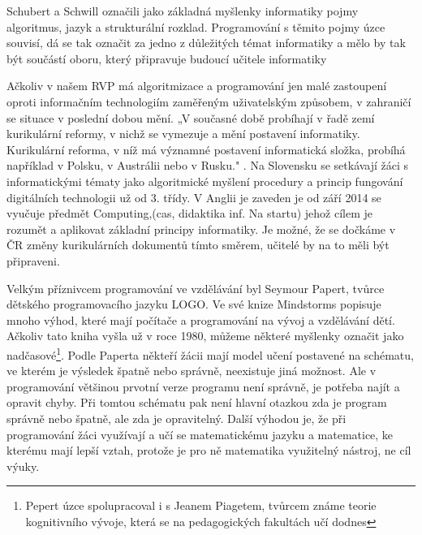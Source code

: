 \documentclass[FP,DP]{tulthesis}
\begin{document}
{{{{{{{Schubert a Schwill \citep{didaktikderinformatik} označili jako základná myšlenky informatiky pojmy algoritmus, jazyk a strukturální rozklad. Programování s těmito pojmy úzce souvisí, dá se tak označit za jedno z důležitých témat informatiky a mělo by tak být součástí oboru, který připravuje budoucí učitele informatiky

Ačkoliv v našem RVP má algoritmizace a programování jen malé zastoupení oproti informačním technologiím zaměřeným uživatelským způsobem, v zahraničí se situace v poslední  dobou mění. „V současné době probíhají v řadě zemí kurikulární reformy, v nichž se vymezuje a mění postavení informatiky. Kurikulární reforma, v níž má významné postavení informatická složka, probíhá například v Polsku, v Austrálii nebo v Rusku." \citep{nastartu}. Na Slovensku se setkávají žáci s informatickými tématy jako algoritmické myšlení procedury a princip fungování digitálních technologii  už od 3. třídy. V Anglii je zaveden je od září  2014 se vyučuje  předmět Computing,(cas, didaktika inf. Na startu) jehož cílem je rozumět a aplikovat  základní principy informatiky.  Je možné, že se dočkáme v ČR změny kurikulárních dokumentů tímto směrem, učitelé by na to měli být připraveni.

 Velkým příznivcem programování ve vzdělávání byl Seymour Papert, tvůrce dětského programovacího jazyku LOGO. Ve své knize Mindstorms popisuje mnoho výhod, které mají  počítače a programování na vývoj a vzdělávání dětí. Ačkoliv tato kniha vyšla už v roce 1980, můžeme některé myšlenky označit jako nadčasové\footnote{Pepert úzce spolupracoval i s Jeanem Piagetem, tvůrcem známe teorie kognitivního vývoje, která se na pedagogických fakultách učí dodnes}. Podle Paperta někteří žácii mají model učení postavené na schématu, ve kterém je výsledek špatně nebo správně, neexistuje jiná možnost. Ale v programování většinou prvotní verze programu není správně, je potřeba najít a opravit chyby. Při tomtou schématu  pak není hlavní otazkou zda je program správně nebo špatně, ale zda je opravitelný. Další výhodou je, že při programování žáci využívají a učí se matematickému jazyku a matematice, ke kterému mají lepší vztah, protože je pro ně matematika využitelný nástroj, ne cíl výuky.



}}}}}}}
\end{document}
